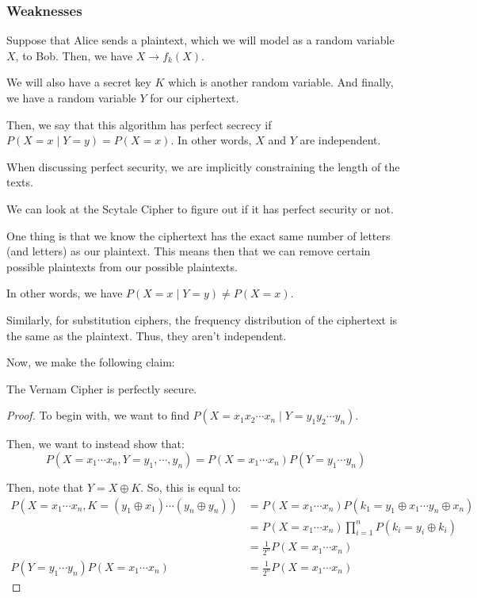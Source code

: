 \documentclass[openany]{book}
\begin{document}
\subsubsection{Weaknesses}
\begin{defn}
	Suppose that Alice sends a plaintext, which we will model as a random variable $X$, to Bob. Then, we have $X \rightarrow f_k(X)$. 
	
	We will also have a secret key $K$ which is another random variable. And finally, we have a random variable $Y$ for our ciphertext.
	
	
	Then, we say that this algorithm has perfect secrecy if $P(X=x \mid Y = y) = P(X = x)$. In other words, $X$ and $Y$ are independent.
\end{defn}
\begin{rmk}
	When discussing perfect security, we are implicitly constraining the length of the texts.
\end{rmk}

\begin{example}
	We can look at the Scytale Cipher to figure out if it has perfect security or not.
	
	One thing is that we know the ciphertext has the exact same number of letters (and letters) as our plaintext. This means then that we can remove certain possible plaintexts from our possible plaintexts.
	
	In other words, we have $P(X = x \mid Y = y) \neq P(X = x)$.
	
	Similarly, for substitution ciphers, the frequency distribution of the ciphertext is the same as the plaintext. Thus, they aren't independent.
\end{example}

Now, we make the following claim:
\begin{prop}
	The Vernam Cipher is perfectly secure.
\end{prop}
\begin{proof}
	To begin with, we want to find $P(X = x_1x_2 \cdots x_n \mid Y = y_1y_2\cdots y_n)$.
	
	Then, we want to instead show that:
	\begin{equation*}
		P(X=x_1 \cdots x_n, Y=y_1, \cdots , y_n) = P(X=x_1\cdots x_n) P(Y=y_1 \cdots y_n)
	\end{equation*}
	
	Then, note that $Y = X \oplus K$. So, this is equal to:
	\begin{align*}
		P(X=x_1 \cdots x_n, K = (y_1\oplus x_1)\cdots(y_n \oplus y_n)) &= P(X=x_1 \cdots x_n) P(k_1 = y_1 \oplus x_1 \cdots y_n \oplus x_n) \\
		&= P(X=x_1 \cdots x_n) \prod_{i=1}^{n} P(k_i = y_i \oplus k_i) \\
		&= \frac 1 {2^{n}} P(X= x_1 \cdots x_n) \\
		P(Y = y_1 \cdots y_n) P(X = x_1 \cdots x_n) &= \frac 1{2^{n}} P(X=x_1 \cdots x_n)
	\end{align*}
\end{proof}
\end{document}
